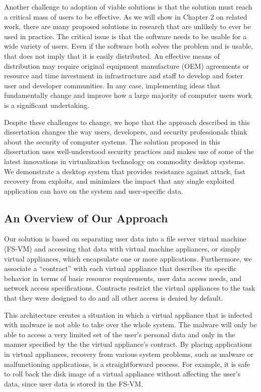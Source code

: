 Another challenge to adoption of viable solutions is that the solution must reach a critical mass of users to be effective.  As we will show in Chapter 2 on related work, there are many proposed solutions in research that are unlikely to ever be used in practice. The critical issue is that the software needs to be usable for a wide variety of users. Even if the software both solves the problem and is usable, that does not imply that it is easily distributed. An effective means of distribution may require original equipment manufacture (OEM) agreements or resource and time investment in infrastructure and staff to develop and foster user and developer communities. In any case, implementing ideas that fundamentally change and improve how a large majority of computer users work is a significant undertaking.

Despite these challenges to change, we hope that the approach described in this dissertation changes the way users, developers, and security professionals think about the security of computer systems. The solution proposed in this dissertation uses well-understood security practices and makes use of some of the latest innovations in virtualization technology on commodity desktop systems. We demonstrate a desktop system that provides resistance against attack, fast recovery from exploits, and minimizes the impact that any single exploited application can have on the system and user-specific data.

\subsection{An Overview of Our Approach}

Our solution is based on separating user data into a file server virtual machine (FS-VM) and accessing that data with virtual machine appliances, or simply virtual appliances, which encapsulate one or more applications. Furthermore, we associate a ``contract'' with each virtual appliance that describes its specific behavior in terms of basic resource requirements, user data access needs, and network access specifications. Contracts restrict the virtual appliances to the task that they were designed to do and all other access is denied by default.

This architecture creates a situation in which a virtual appliance that is infected with malware is not able to take over the whole system. The malware will only be able to access a very limited set of the user's personal data and only in the manner specified by the the virtual appliance's contract. By placing applications in virtual appliances, recovery from various system problems, such as malware or malfunctioning applications, is a straightforward process. For example, it is safe to roll back the disk image of a virtual appliance without affecting the user's data, since user data is stored in the FS-VM.

